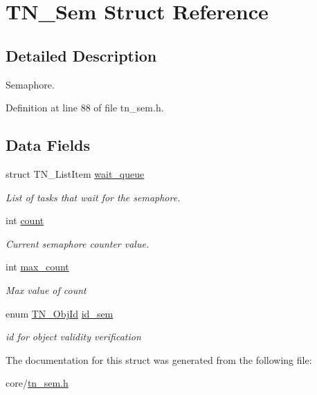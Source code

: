 \hypertarget{structTN__Sem}{\section{T\+N\+\_\+\+Sem Struct Reference}
\label{structTN__Sem}
}


\subsection{Detailed Description}
Semaphore. 

Definition at line 88 of file tn\+\_\+sem.\+h.

\subsection*{Data Fields}
\begin{DoxyCompactItemize}
\item 
\hypertarget{structTN__Sem_ac6cf5b47221528a5ce024c60b92be280}{struct T\+N\+\_\+\+List\+Item \hyperlink{structTN__Sem_ac6cf5b47221528a5ce024c60b92be280}{wait\+\_\+queue}}\label{structTN__Sem_ac6cf5b47221528a5ce024c60b92be280}

\begin{DoxyCompactList}\small\item\em List of tasks that wait for the semaphore. \end{DoxyCompactList}\item 
\hypertarget{structTN__Sem_a5a2358e2425da2930ef8e105a642822b}{int \hyperlink{structTN__Sem_a5a2358e2425da2930ef8e105a642822b}{count}}\label{structTN__Sem_a5a2358e2425da2930ef8e105a642822b}

\begin{DoxyCompactList}\small\item\em Current semaphore counter value. \end{DoxyCompactList}\item 
\hypertarget{structTN__Sem_abd62d79c3aace05abd7252f2058b1e5b}{int \hyperlink{structTN__Sem_abd62d79c3aace05abd7252f2058b1e5b}{max\+\_\+count}}\label{structTN__Sem_abd62d79c3aace05abd7252f2058b1e5b}

\begin{DoxyCompactList}\small\item\em Max value of {\ttfamily count} \end{DoxyCompactList}\item 
\hypertarget{structTN__Sem_a810526e9b3d5595278ebb70e59a128e1}{enum \hyperlink{tn__common_8h_ae779dd1f6735f6e139fb70acd004d976}{T\+N\+\_\+\+Obj\+Id} \hyperlink{structTN__Sem_a810526e9b3d5595278ebb70e59a128e1}{id\+\_\+sem}}\label{structTN__Sem_a810526e9b3d5595278ebb70e59a128e1}

\begin{DoxyCompactList}\small\item\em id for object validity verification \end{DoxyCompactList}\end{DoxyCompactItemize}


The documentation for this struct was generated from the following file\+:\begin{DoxyCompactItemize}
\item 
core/\hyperlink{tn__sem_8h}{tn\+\_\+sem.\+h}\end{DoxyCompactItemize}
